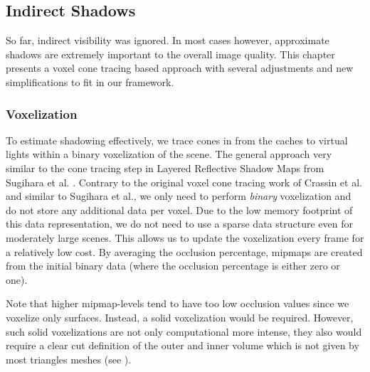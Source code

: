 \documentclass[thesis.tex]{subfiles}
\begin{document}
\subsection{Indirect Shadows}
So far, indirect visibility was ignored.
In most cases however, approximate shadows are extremely important to the overall image quality. 
This chapter presents a voxel cone tracing based approach with several adjustments and new simplifications to fit in our framework.

\subsubsection{Voxelization}\label{sec:impl:voxelization}
To estimate shadowing effectively, we trace cones in from the caches to virtual lights within a binary voxelization of the scene.
The general approach very similar to the cone tracing step in \cite{bib:layeredrsm} Layered Reflective Shadow Maps from Sugihara et al. \cite{bib:layeredrsm}.
Contrary to the original voxel cone tracing work of Crassin et al. \cite{bib:voxelconetracing} and similar to Sugihara et al., we only need to perform \emph{binary} voxelization and do not store any additional data per voxel.
Due to the low memory footprint of this data representation, we do not need to use a sparse data structure even for moderately large scenes.
This allows us to update the voxelization every frame for a relatively low cost.
By averaging the occlusion percentage, mipmaps are created from the initial binary data (where the occlusion percentage is either zero or one).

Note that higher mipmap-levels tend to have too low occlusion values since we voxelize only surfaces.
Instead, a solid voxelization would be required.
However, such solid voxelizations are not only computational more intense, they also would require a clear cut definition of the outer and inner volume which is not given by most triangles meshes (see ).
\end{document}
